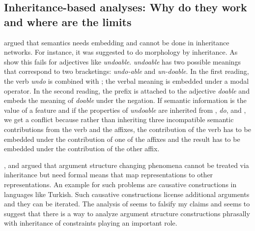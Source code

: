 \subsection{Inheritance-based analyses: Why do they work and where are the limits}

\citet{MuellerPersian} argued that semantics needs embedding and cannot be done in inheritance
networks. For instance, it was suggested to do morphology by inheritance. As \citet{KN93a} show this
fails for adjectives like \emph{undoable}. \emph{undoable} has two possible meanings that correspond
to two bracketings: \emph{undo-able} and \emph{un-doable}. In the first reading, the verb \emph{undo}
is combined with ; the verbal meaning is embedded under a modal operator. In the second
reading, the prefix  is attached to the adjective \emph{doable} and embeds the meaning
of \emph{doable} under the negation. If semantic information is the value of a feature and if
the properties of \emph{undoable} are inherited from , \emph{do}, and , we
get a conflict because rather than inheriting three incompatible semantic contributions from the
verb and the affixes, the contribution of the verb has to be embedded under the contribution of one
of the affixes and the result has to be embedded under the contribution of the other affix.  

\citet{MuellerLehrbuch1}, \citet{MuellerUnifying} and \citet{MWArgSt} argued that argument structure changing
phenomena cannot be treated via inheritance but need formal means that map representations to other
representations. An example for such problems are causative constructions in languages like Turkish.
Such causative constructions license additional arguments and they can be iterated. The analysis of
\citet{AGT2014a} seems to falsify my claims and seems to suggest that there is a way to analyze
argument structure constructions phrasally with inheritance of constraints playing an important role.

